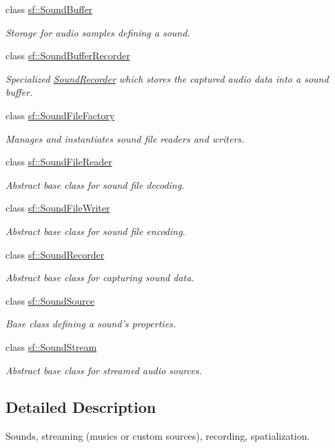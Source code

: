 \begin{DoxyCompactItemize}
class \hyperlink{classsf_1_1_sound_buffer}{sf\-::\-Sound\-Buffer}
\begin{DoxyCompactList}\small\item\em Storage for audio samples defining a sound. \end{DoxyCompactList}\item 
class \hyperlink{classsf_1_1_sound_buffer_recorder}{sf\-::\-Sound\-Buffer\-Recorder}
\begin{DoxyCompactList}\small\item\em Specialized \hyperlink{classsf_1_1_sound_recorder}{Sound\-Recorder} which stores the captured audio data into a sound buffer. \end{DoxyCompactList}\item 
class \hyperlink{classsf_1_1_sound_file_factory}{sf\-::\-Sound\-File\-Factory}
\begin{DoxyCompactList}\small\item\em Manages and instantiates sound file readers and writers. \end{DoxyCompactList}\item 
class \hyperlink{classsf_1_1_sound_file_reader}{sf\-::\-Sound\-File\-Reader}
\begin{DoxyCompactList}\small\item\em Abstract base class for sound file decoding. \end{DoxyCompactList}\item 
class \hyperlink{classsf_1_1_sound_file_writer}{sf\-::\-Sound\-File\-Writer}
\begin{DoxyCompactList}\small\item\em Abstract base class for sound file encoding. \end{DoxyCompactList}\item 
class \hyperlink{classsf_1_1_sound_recorder}{sf\-::\-Sound\-Recorder}
\begin{DoxyCompactList}\small\item\em Abstract base class for capturing sound data. \end{DoxyCompactList}\item 
class \hyperlink{classsf_1_1_sound_source}{sf\-::\-Sound\-Source}
\begin{DoxyCompactList}\small\item\em Base class defining a sound's properties. \end{DoxyCompactList}\item 
class \hyperlink{classsf_1_1_sound_stream}{sf\-::\-Sound\-Stream}
\begin{DoxyCompactList}\small\item\em Abstract base class for streamed audio sources. \end{DoxyCompactList}\end{DoxyCompactItemize}


\subsection{Detailed Description}
Sounds, streaming (musics or custom sources), recording, spatialization. 
